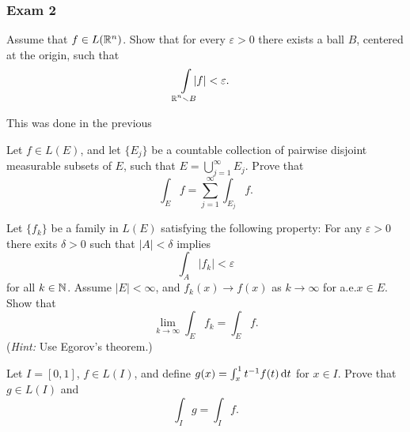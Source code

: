\subsubsection{Exam 2}
\setcounter{exercise}{0}
\setcounter{equation}{0}

\begin{problem}
  Assume that \(f\in L(\mathbb{R}^n)\). Show that for every \(\varepsilon>0\)
  there exists a ball \(B\), centered at the origin, such that
  \[
    \int\limsclap{\bbR^n\setminus B}|f|<\varepsilon.
  \]
\end{problem}
\begin{solution}
  This was done in the previous
\end{solution}

\begin{problem}
  Let \(f\in L(E)\), and let \(\{E_j\}\) be a countable collection of
  pairwise disjoint measurable subsets of \(E\), such that
  \(E=\bigcup_{j=1}^\infty E_j\). Prove that
  \[
    \int_E f=\sum_{j=1}^\infty\int_{E_j}f.
  \]
\end{problem}
\begin{solution}
\end{solution}

\begin{problem}
  Let \(\{f_k\}\) be a family in \(L(E)\) satisfying the following
  property: For any \(\varepsilon>0\) there exits \(\delta>0\) such that
  \(|A|<\delta\) implies
  \[
    \int_A |f_k|<\varepsilon
  \]
  for all \(k\in\mathbb{N}\). Assume \(|E|<\infty\), and \(f_k(x)\to f(x)\) as
  \(k\to\infty\) for a.e.\@ \(x\in E\). Show that
  \[
    \lim_{k\to\infty}\int_E f_k=\int_E f.
  \]
  (\emph{Hint:} Use Egorov's theorem.)
\end{problem}
\begin{solution}
\end{solution}

\begin{problem}
  Let \(I=[0,1]\), \(f\in L(I)\), and define
  \(g(x)=\int_x^1 t^{-1}f(t) \mathop{}\!\mathrm{d} t\) for \(x\in I\). Prove that
  \(g\in L(I)\) and
  \[
    \int_I g=\int_I f.
  \]
\end{problem}
\begin{solution}
\end{solution}

